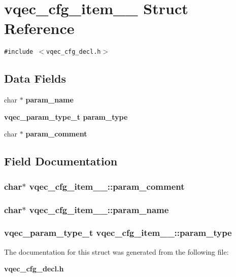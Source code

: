 \section{vqec\_\-cfg\_\-item\_\-\_\- Struct Reference}
\label{structvqec__cfg__item____}
{\tt \#include $<$vqec\_\-cfg\_\-decl.h$>$}

\subsection*{Data Fields}
\begin{CompactItemize}
\item 
char $\ast$ \bf{param\_\-name}
\item 
\bf{vqec\_\-param\_\-type\_\-t} \bf{param\_\-type}
\item 
char $\ast$ \bf{param\_\-comment}
\end{CompactItemize}


\subsection{Field Documentation}
\subsubsection{\setlength{\rightskip}{0pt plus 5cm}char$\ast$ \bf{vqec\_\-cfg\_\-item\_\-\_\-::param\_\-comment}}\label{structvqec__cfg__item_____a058218d9f828a9f2577796af169faf1}


\subsubsection{\setlength{\rightskip}{0pt plus 5cm}char$\ast$ \bf{vqec\_\-cfg\_\-item\_\-\_\-::param\_\-name}}\label{structvqec__cfg__item_____27cace60b66af4a4abcd61961b493aa6}


\subsubsection{\setlength{\rightskip}{0pt plus 5cm}\bf{vqec\_\-param\_\-type\_\-t} \bf{vqec\_\-cfg\_\-item\_\-\_\-::param\_\-type}}\label{structvqec__cfg__item_____d453c220abb35d53d4ac5b3ca67f2cb9}




The documentation for this struct was generated from the following file:\begin{CompactItemize}
\item 
\bf{vqec\_\-cfg\_\-decl.h}\end{CompactItemize}
